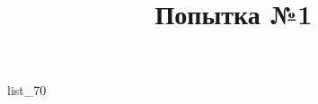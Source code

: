 \documentclass[12pt, a4paper]{article}
\begin{document}
	\title{Попытка №1}
	{list_70}
\end{document}
